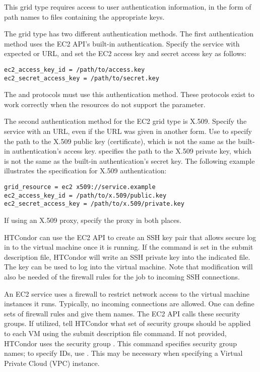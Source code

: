 This grid type requires access to user authentication information,
in the form of path names to files containing the appropriate keys.

The  grid type has two different authentication methods.
The first authentication method uses the EC2 API's built-in authentication.
Specify the service with expected  or  URL,
and set the EC2 access key and secret access key as follows:

\begin{verbatim}
ec2_access_key_id = /path/to/access.key
ec2_secret_access_key = /path/to/secret.key
\end{verbatim}

The  and  protocols must use this 
authentication method.
These protocols exist to work correctly when the resources do not support
the  parameter.

The second authentication method for the EC2 grid type is X.509.
Specify the service with an  URL, 
even if the URL was given in another form.  
Use  to 
specify the path to the X.509 public key (certificate),
which is not the same as the built-in authentication's access key.
 specifies the path to the X.509 
private key,
which is not the same as the built-in authentication's secret key.
The following example illustrates the specification for X.509 authentication:

\begin{verbatim}
grid_resource = ec2 x509://service.example
ec2_access_key_id = /path/to/x.509/public.key
ec2_secret_access_key = /path/to/x.509/private.key
\end{verbatim}

If using an X.509 proxy, specify the proxy in both places.

HTCondor can use the EC2 API to create an SSH key pair that allows
secure log in to the virtual machine once it is running.
If the command
is set in the submit description file,
HTCondor will write an SSH private key into the indicated file.
The key can be used to log into the virtual machine.
Note that modification will also be needed of the firewall
rules for the job to incoming SSH connections.

An EC2 service uses a firewall to restrict network access to
the virtual machine instances it runs.
Typically, no incoming connections are allowed.
One can define sets of firewall rules and give them names.
The EC2 API calls these security groups.
If utilized, tell HTCondor what set of security
groups should be applied to each VM using the
 submit description file command.
If not provided, HTCondor uses the security group .
This command specifies security group names; to specify IDs, use
.  This may be necessary when specifying
a Virtual Private Cloud (VPC) instance.

